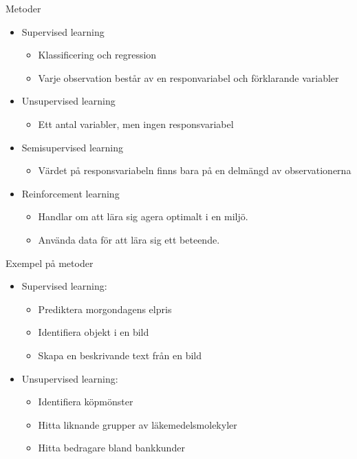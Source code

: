 \documentclass[10pt,english]{beamer}
\begin{document}
\begin{frame}{Metoder}
    \begin{itemize}
        \item Supervised learning
        \begin{itemize}
            \item Klassificering och regression
            \item Varje observation består av en responvariabel och förklarande variabler
        \end{itemize}
        \item Unsupervised learning
        \begin{itemize}
            \item Ett antal variabler, men ingen responsvariabel
        \end{itemize}
        \item Semisupervised learning
        \begin{itemize}
            \item Värdet på responsvariabeln finns bara på en delmängd av observationerna
        \end{itemize}
        \item Reinforcement learning
        \begin{itemize}
            \item Handlar om att lära sig agera optimalt i en miljö.
            \item Använda data för att lära sig ett beteende.
        \end{itemize}
    \end{itemize}
\end{frame}

\begin{frame}{Exempel på metoder}
    \begin{itemize}
        \item Supervised learning:
        \begin{itemize}
            \item Prediktera morgondagens elpris
            \item Identifiera objekt i en bild
            \item Skapa en beskrivande text från en bild
        \end{itemize}
        \item Unsupervised learning:
        \begin{itemize}
            \item Identifiera köpmönster
            \item Hitta liknande grupper av läkemedelsmolekyler
            \item Hitta bedragare bland bankkunder
        \end{itemize}
    \end{itemize}
\end{frame}
\end{document}
